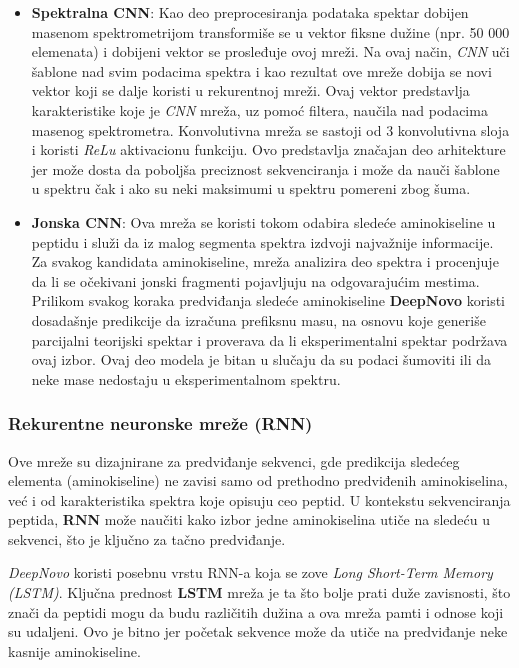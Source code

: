 \documentclass[12pt,oneside]{memoir}
\begin{document}
\begin{itemize}
\item \textbf{Spektralna CNN}: Kao deo preprocesiranja podataka spektar dobijen masenom spektrometrijom transformiše se u vektor fiksne dužine (npr. 50 000 elemenata) i dobijeni vektor se prosleđuje ovoj mreži. Na ovaj način, \emph{CNN} uči šablone nad svim podacima spektra i kao rezultat ove mreže dobija se novi vektor koji se dalje koristi u rekurentnoj mreži. Ovaj vektor predstavlja karakteristike koje je \emph{CNN} mreža, uz pomoć filtera, naučila nad podacima masenog spektrometra. Konvolutivna mreža se sastoji od 3 konvolutivna sloja i koristi \emph{ReLu} aktivacionu funkciju. Ovo predstavlja značajan deo arhitekture jer može dosta da poboljša preciznost sekvenciranja i može da nauči šablone u spektru čak i ako su neki maksimumi u spektru pomereni zbog šuma.
\item \textbf{Jonska CNN}: Ova mreža se koristi tokom odabira sledeće aminokiseline u peptidu i služi da iz malog segmenta spektra izdvoji najvažnije informacije. Za svakog kandidata aminokiseline, mreža analizira deo spektra i procenjuje da li se očekivani jonski fragmenti pojavljuju na odgovarajućim mestima. Prilikom svakog koraka predviđanja sledeće aminokiseline \textbf{DeepNovo} koristi dosadašnje predikcije da izračuna prefiksnu masu, na osnovu koje generiše parcijalni teorijski spektar i proverava da li eksperimentalni spektar podržava ovaj izbor. Ovaj deo modela je bitan u slučaju da su podaci šumoviti ili da neke mase nedostaju u eksperimentalnom spektru.
\end{itemize}

\subsubsection{Rekurentne neuronske mreže (RNN)}
Ove mreže su dizajnirane za predviđanje sekvenci, gde predikcija sledećeg elementa (aminokiseline) ne zavisi samo od prethodno predviđenih aminokiselina, već i od karakteristika spektra koje opisuju ceo peptid. U kontekstu sekvenciranja peptida, \textbf{RNN} može naučiti kako izbor jedne aminokiselina utiče na sledeću u sekvenci, što je ključno za tačno predviđanje.

\emph{DeepNovo} koristi posebnu vrstu RNN-a koja se zove \emph{Long Short-Term Memory (LSTM)}. Ključna prednost \textbf{LSTM} mreža je ta što bolje prati duže zavisnosti, što znači da peptidi mogu da budu različitih dužina a ova mreža pamti i odnose koji su udaljeni. Ovo je bitno jer početak sekvence može da utiče na predviđanje neke kasnije aminokiseline.
\end{document}
